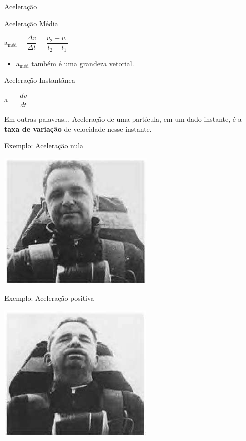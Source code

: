 \documentclass[xcolor=dvipsnames,table]{beamer}
\begin{document}
	\begin{frame}{Aceleração}
		\begin{block}{Aceleração Média}
			\begin{center}
				a$_{\mbox{méd}} = \dfrac{\Delta v}{\Delta t} = \dfrac{v_2 - v_1}{t_2 - t_1}$
			\end{center} \pause
			\begin{itemize}
				\item a$_{\mbox{méd}}$ também é uma grandeza vetorial.
			\end{itemize}
		\end{block} \pause
		\begin{block}{Aceleração Instantânea}
			\begin{center}
				a $= \dfrac{d v}{d t}$
			\end{center}
		\end{block} \pause
		\begin{block}{Em outras palavras...}
			Aceleração de uma partícula, em um dado instante, é a {\bf taxa de variação} de velocidade nesse instante.
		\end{block}
	\end{frame}

	\begin{frame}{Exemplo: Aceleração nula}
		\begin{center}
			\includegraphics[scale=0.8]{images/fig2-7a}
		\end{center}
	\end{frame}

	\begin{frame}{Exemplo: Aceleração positiva}
		\begin{center}
			\includegraphics[scale=0.8]{images/fig2-7b}
		\end{center}
	\end{frame}
\end{document}
